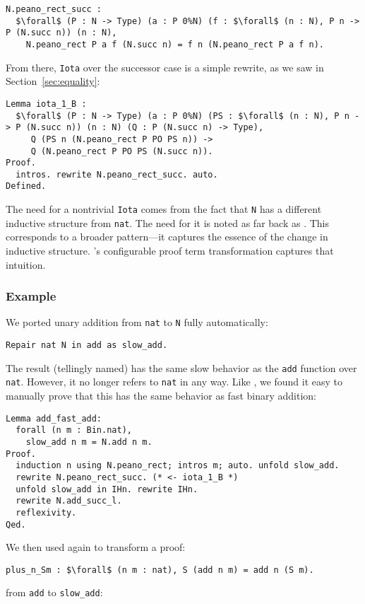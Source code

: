 \begin{lstlisting}
N.peano_rect_succ :
  $\forall$ (P : N -> Type) (a : P 0%N) (f : $\forall$ (n : N), P n -> P (N.succ n)) (n : N),
    N.peano_rect P a f (N.succ n) = f n (N.peano_rect P a f n).
\end{lstlisting}
From there, \lstinline{Iota} over the successor case is a simple rewrite, as we saw in Section~\ref{sec:equality}:

\begin{lstlisting}
Lemma iota_1_B :
  $\forall$ (P : N -> Type) (a : P 0%N) (PS : $\forall$ (n : N), P n -> P (N.succ n)) (n : N) (Q : P (N.succ n) -> Type),
     Q (PS n (N.peano_rect P PO PS n)) ->
     Q (N.peano_rect P PO PS (N.succ n)).
Proof.
  intros. rewrite N.peano_rect_succ. auto.
Defined.
\end{lstlisting}

The need for a nontrivial \lstinline{Iota} comes from the fact that \lstinline{N} has a different
inductive structure from \lstinline{nat}.
The need for it is noted as far back as \citet{magaud2000changing}.
This corresponds to a broader pattern---it captures the essence of the change in inductive structure.
\toolname's configurable proof term transformation captures that intuition.

\subsubsection{Example}

We ported unary addition from \lstinline{nat} to \lstinline{N} fully automatically:

\begin{lstlisting}
Repair nat N in add as slow_add.
\end{lstlisting}
The result (tellingly named) has the same slow behavior as the \lstinline{add} function over \lstinline{nat}.
However, it no longer refers to \lstinline{nat} in any way.
Like \citet{magaud2000changing}, we found it easy to manually prove that
this has the same behavior as fast binary addition:

\begin{lstlisting}
Lemma add_fast_add:
  forall (n m : Bin.nat),
    slow_add n m = N.add n m.
Proof.
  induction n using N.peano_rect; intros m; auto. unfold slow_add.
  rewrite N.peano_rect_succ. (* <- iota_1_B *)
  unfold slow_add in IHn. rewrite IHn.
  rewrite N.add_succ_l.
  reflexivity.
Qed.
\end{lstlisting}

We then used \toolname again to transform a proof:
\begin{lstlisting}
plus_n_Sm : $\forall$ (n m : nat), S (add n m) = add n (S m).
\end{lstlisting}
from \lstinline{add} to \lstinline{slow_add}:


